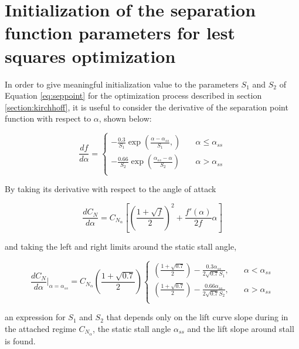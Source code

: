 \section{Initialization of the separation function parameters for lest squares optimization}


In order to give meaningful initialization value to the parameters $S_1$ and $S_2$ of Equation \eqref{eq:seppoint} for the optimization process described in section \ref{section:kirchhoff}, it is useful to consider the derivative of the separation point function with respect to $\alpha$, shown below:

\begin{equation} 
\frac{df}{d\alpha} = 
     \begin{cases}
       -\frac{0.3}{S_1}\exp(\frac{\alpha-\alpha_{ss}}{S_1},) &\quad \alpha \leq \alpha_{ss}\\
        -\frac{0.66}{S_2}\exp(\frac{\alpha_{ss}-\alpha}{S_2}) &\quad \alpha > \alpha_{ss}\\
     \end{cases}
\end{equation}

By taking its derivative with respect to the angle of attack

\begin{equation}
\frac{dC_N}{d\alpha} = C_{N_{\alpha}} \left[\left(\frac{1+\sqrt{f}}{2}\right)^2+\frac{f'(\alpha)}{2f}\alpha \right]
\end{equation}

\noindent and taking the left and right limits around the static stall angle,

\begin{equation}
\frac{dC_N}{d\alpha}\Big|_{\alpha=\alpha_{ss}} = C_{N_\alpha}\left(\frac{1+\sqrt{0.7}}{2}\right)
     \begin{cases}
      \left(\frac{1+\sqrt{0.7}}{2}\right)-\frac{0.3\alpha_{ss}}{2\sqrt{0.7}S_1},&\quad \alpha < \alpha_{ss}\\
        \left(\frac{1+\sqrt{0.7}}{2}\right)-\frac{0.66\alpha_{ss}}{2\sqrt{0.7}S_2}, &\quad \alpha > \alpha_{ss}\\
     \end{cases}
\end{equation}

\noindent an expression for $S_1$ and $S_2$ that depends only on the lift curve slope during in the attached regime $C_{N_\alpha}$, the static stall angle $\alpha_{ss}$ and the lift slope around stall is found.

